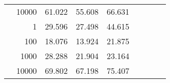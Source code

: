 \begin{table}
\begin{tabular}{rrrrrrrrr}
	            
					 &  
					 
					\multirow{ 1 }{*}{ 10000 } &
					
						
							    
							    
	                           61.022 & 55.608 & 66.631  \\
	                
	            
	        
				\noalign{\smallskip}\hline
				\multirow{ 4 }{*}{ 2000000 } &
				
					
					 
					\multirow{ 1 }{*}{ 1 } &
					
						
							    
							    
	                           29.596 & 27.498 & 44.615  \\
	                
	            
					 &  
					 
					\multirow{ 1 }{*}{ 100 } &
					
						
							    
							    
	                           18.076 & 13.924 & 21.875  \\
	                
	            
					 &  
					 
					\multirow{ 1 }{*}{ 1000 } &
					
						
							    
							    
	                           28.288 & 21.904 & 23.164  \\
	                
	            
					 &  
					 
					\multirow{ 1 }{*}{ 10000 } &
					
						
							    
							    
	                           69.802 & 67.198 & 75.407  \\
	                
	            
	        

\hline

\end{tabular}
\end{table}
\clearpage


	    

